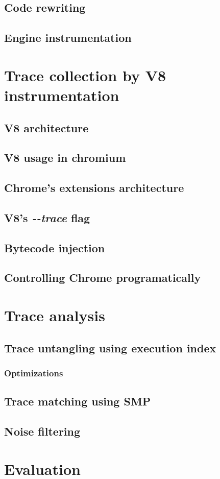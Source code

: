 \documentclass[en]{pracamgr}
\begin{document}
\section{Code rewriting}


\section{Engine instrumentation}

\chapter{Trace collection by V8 instrumentation}
\section{V8 architecture}
\section{V8 usage in chromium}
\section{Chrome's extensions architecture}
\section{V8's \emph{-{}-trace} flag}
\section{Bytecode injection}
\section{Controlling Chrome programatically}

\chapter{Trace analysis}
\section{Trace untangling using execution index}
\subsection{Optimizations}
\section{Trace matching using SMP}
\section{Noise filtering}

\chapter{Evaluation}


{}

\end{document}
